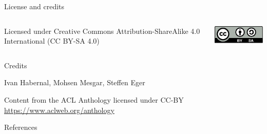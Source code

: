 \documentclass[12pt]{beamer}
\begin{document}
\begin{frame}{License and credits}

\begin{columns}
	\begin{column}{0.7\textwidth}
		Licensed under Creative Commons Attribution-ShareAlike 4.0 International (CC BY-SA 4.0)
	\end{column}
	\begin{column}{0.2\textwidth}
		\includegraphics[width=0.9\linewidth]{img/cc-by-sa-icon.pdf}
	\end{column}
\end{columns}

\bigskip

Credits

\begin{scriptsize}
	
Ivan Habernal, Mohsen Mesgar, Steffen Eger

Content from the ACL Anthology licensed under CC-BY \url{https://www.aclweb.org/anthology}

\end{scriptsize}

\end{frame}

\begin{frame}[allowframebreaks]{References}
\printbibliography
%  
%  
\end{frame}
\end{document}
